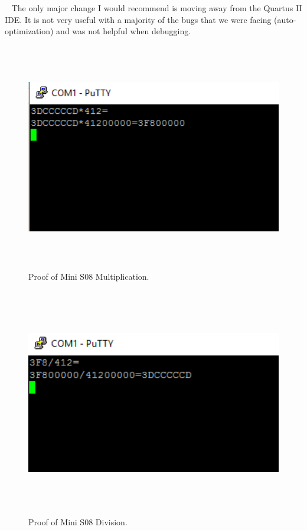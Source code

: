 \documentclass[letterpaper, 12pt]{article}
\begin{document}
\begin{flushleft}
~\newline
The only major change I would recommend is moving away from the Quartus II IDE.  It is not very useful with a majority of the bugs that we were facing (auto-optimization) and was not helpful when debugging.
 \begin{figure}[H]
	\centering
	\includegraphics[width=\linewidth,height=10cm,keepaspectratio]{multiplication_fpu.PNG}
\caption[MiniS08 Multiplication Proof]{Proof of Mini S08 Multiplication.}
	\label{fig:arch}
\end{figure}
 \begin{figure}[H]
	\centering
	\includegraphics[width=\linewidth,height=10cm,keepaspectratio]{division_fpu.PNG}
\caption[MiniS08 Division Proof]{Proof of Mini S08 Division.}
	\label{fig:arch}
\end{figure}
\newpage

\end{flushleft}
\end{document}
